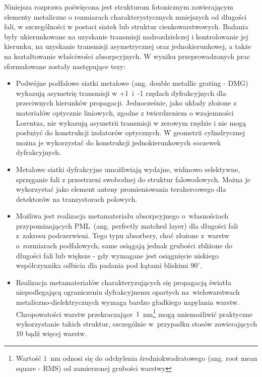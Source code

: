 Niniejsza rozprawa poświęcona jest strukturom fotonicznym zawierającym elementy metaliczne o rozmiarach charakterystycznych mniejszych od długości fali, w szczególności w postaci siatek lub struktur cienkowarstwowych. Badania były ukierunkowane na uzyskanie  transmisji nadrozdzielczej i kontrolowanie jej kierunku, na uzyskanie transmisji asymetrycznej oraz jednokierunkowej, a także na kształtowanie właściwości absorpcyjnych. W wyniku przeprowadzonych prac sformułowane zostały następujące tezy:

\begin{itemize}
\item Podwójne podfalowe siatki metalowe (ang. double metallic grating - DMG) wykazują asymetrię transmisji w +1~i~-1 rzędach dyfrakcyjnych dla przeciwnych kierunków propagacji. Jednocześnie, jako układy złożone z materiałów optycznie liniowych, zgodne z twierdzeniem o wzajemności Lorentza, nie wykazują asymetrii transmisji w zerowym rzędzie i nie mogą posłużyć do konstrukcji izolatorów optycznych. W geometrii cylindrycznej można je wykorzystać do konstrukcji jednokierunkowych soczewek dyfrakcyjnych.

\item Metalowe siatki dyfrakcyjne umożliwiają wydajne, widmowo selektywne, sprzęganie fali z przestrzeni swobodnej do struktur falowodowych. Można je wykorzystać jako element anteny promieniowania terahercowego dla detektorów na tranzystorach polowych.

\item Możliwa jest realizacja metamateriału absorpcyjnego o~własnościach przypominających PML~(ang. perfectly matched layer) dla długości fali z~zakresu podczerwieni. Tego typu absorbery, choć złożone z~warstw o~rozmiarach podfalowych, same osiągają jednak grubości zbliżone do długości fali lub większe - gdy wymagane jest osiągnięcie niskiego współczynnika odbicia dla padania pod kątami bliskimi $90^{\circ}$.

\item Realizacja metamateriałów charakteryzujących się propagacją światła niepodlegającą ograniczeniu dyfrakcyjnemu opartych na~wielowarstwach metaliczno-dielektrycznych wymaga bardzo gładkiego napylania warstw. Chropowatości warstw przekraczające~$1$~nm\footnote{Wartość $1$~nm odnosi się do odchylenia średniokwadratowego (ang. root mean square - RMS) od zamierzonej grubości warstwy} mogą uniemożliwić praktyczne wykorzystanie takich struktur, szczególnie w~przypadku stosów zawierających 10 bądź więcej warstw.
\end{itemize}

